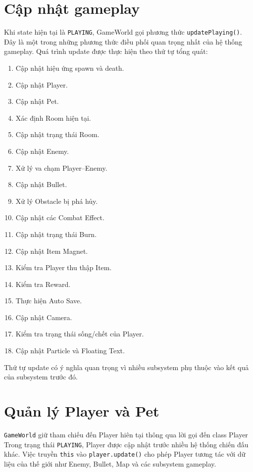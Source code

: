\documentclass[12pt,a4paper]{report}
\begin{document}
    \section{Cập nhật gameplay}
    Khi state hiện tại là \texttt{PLAYING}, GameWorld gọi phương
    thức \texttt{updatePlaying()}.
    Đây là một trong những phương thức điều phối quan trọng nhất
    của hệ thống gameplay.
    Quá trình update được thực hiện theo thứ tự tổng quát:
    \begin{enumerate}
        \item Cập nhật hiệu ứng spawn và death.
        \item Cập nhật Player.
        \item Cập nhật Pet.
        \item Xác định Room hiện tại.
        \item Cập nhật trạng thái Room.
        \item Cập nhật Enemy.
        \item Xử lý va chạm Player--Enemy.
        \item Cập nhật Bullet.
        \item Xử lý Obstacle bị phá hủy.
        \item Cập nhật các Combat Effect.
        \item Cập nhật trạng thái Burn.
        \item Cập nhật Item Magnet.
        \item Kiểm tra Player thu thập Item.
        \item Kiểm tra Reward.
        \item Thực hiện Auto Save.
        \item Cập nhật Camera.
        \item Kiểm tra trạng thái sống/chết của Player.
        \item Cập nhật Particle và Floating Text.
    \end{enumerate}
    Thứ tự update có ý nghĩa quan trọng vì nhiều subsystem phụ
    thuộc vào kết quả của subsystem trước đó.


    \section{Quản lý Player và Pet}
    \texttt{GameWorld} giữ tham chiếu đến Player hiên tại thông qua lời gọi đến class Player
    Trong trạng thái \texttt{PLAYING}, Player được cập nhật trước
    nhiều hệ thống chiến đấu khác.
    Việc truyền \texttt{this} vào \texttt{player.update()} cho phép
    Player tương tác với dữ liệu của thế giới như Enemy, Bullet,
    Map và các subsystem gameplay.
\end{document}
